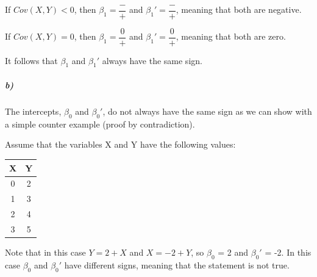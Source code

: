 \documentclass[12pt]{article}\usepackage[]{graphicx}\usepackage[]{color}
\begin{document}
\bigskip

If $Cov(X,Y) < 0$, then $\beta_1 = \dfrac{-}{+}$ and $\beta_1' = \dfrac{-}{+}$, meaning that both are negative.

\bigskip

If $Cov(X,Y) = 0$, then $\beta_1 = \dfrac{0}{+}$ and $\beta_1' = \dfrac{0}{+}$, meaning that both are zero.

\bigskip

It follows that $\beta_1$ and $\beta_1'$ always have the same sign.

\subparagraph{b)} The intercepts, $\beta_0$ and $\beta_0'$, do not always have the same sign as we can show with a simple counter example (proof by contradiction).

Assume that the variables X and Y have the following values:

\begin{center}
 \begin{tabular}{||c c||} 
 \hline
 X & Y \\ [0.5ex] 
 \hline\hline
 0 & 2 \\ 
 \hline
 1 & 3 \\
 \hline
 2 & 4 \\
 \hline
 3 & 5 \\
  \hline
\end{tabular}
\end{center}

Note that in this case $Y = 2 + X$ and $X = -2 + Y$, so $\beta_0$ = 2 and $\beta_0'$ = -2. In this case $\beta_0$ and $\beta_0'$ have different signs, meaning that the statement is not true.
\end{document}
